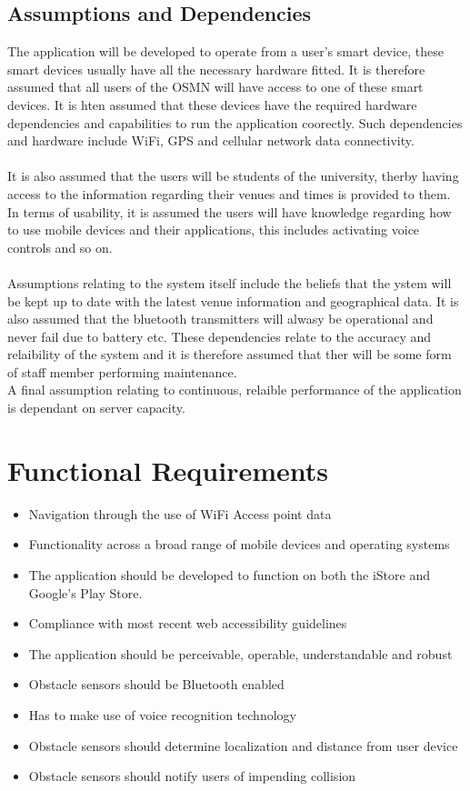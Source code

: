 \documentclass{article}
\begin{document}
	
	\newpage
	\subsection{Assumptions and Dependencies}
		The application will be developed to operate from a user's smart device, these smart devices usually have all the necessary hardware fitted. It is therefore assumed that all users of the OSMN will have access to one of these smart devices. It is hten assumed that these devices have the required hardware dependencies and capabilities to run the application coorectly. Such dependencies and hardware include WiFi, GPS and cellular network data connectivity.\\ \\
		It is also assumed that the users will be students of the university, therby having access to the information regarding their venues and times is provided to them.\\
		In terms of usability, it is assumed the users will have knowledge regarding how to use mobile devices and their applications, this includes activating voice controls and so on. \\ \\
		Assumptions relating to the system itself include the beliefs that the ystem will be kept up to date with the latest venue information and geographical data. It is also assumed that the bluetooth transmitters will alwasy be operational and never fail due to battery etc. These dependencies relate to the accuracy and relaibility of the system and it is therefore assumed that ther will be some form of staff member performing maintenance.\\
		A final assumption relating to continuous, relaible performance of the application is dependant on server capacity.
		
		
		

\newpage
\section{Functional Requirements}
\begin{itemize}
	\item Navigation through the use of WiFi Access point data
	\item Functionality across a broad range of mobile devices and operating systems
	\item The application should be developed to function on both the iStore and Google's Play Store.
	\item Compliance with most recent web accessibility guidelines
	\item The application should be perceivable, operable, understandable and robust
	\item Obstacle sensors should be Bluetooth enabled
	\item Has to make use of voice recognition technology
	\item Obstacle sensors should determine localization and distance from user device
	\item Obstacle sensors should notify users of impending collision
\end{itemize}
\end{document}

